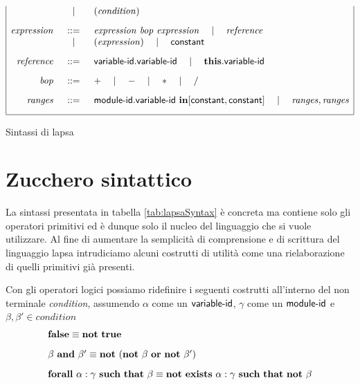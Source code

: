 \begin{table}[htbp!]
$$\begin{array}{|rcl|}
		& \quad\mid\quad & (\mathit{condition})
	\\[.3cm]
	\mathit{expression} &::=& \mathit{expression} \mbox{ } \mathit{bop} \mbox{ } \mathit{expression} \quad\mid\quad \mathit{reference} \\
	& \quad\mid\quad & (\mathit{expression}) \quad\mid\quad {\sf constant}
	\\[.3cm]
	\mathit{reference} &::=& {\sf variable}\textrm{-}{\sf id}\mathbf{.}{\sf variable}\textrm{-}{\sf id} \quad\mid\quad \mathbf{this}\mathbf{.}{\sf variable}\textrm{-}{\sf id}
	\\[.3cm]
	\mathit{bop} &::=& + \quad\mid\quad - \quad\mid\quad * \quad\mid\quad \slash
	\\[.3cm]
	\mathit{ranges} &::=& {\sf module}\textrm{-}{\sf id}\mathbf{.}{\sf variable}\textrm{-}{\sf id} \mbox{ } \mathbf{in} [{\sf constant}, {\sf constant}] \quad\mid\quad \mathit{ranges}, \mathit{ranges} 
	\\[.3cm]
	\hline
	\end{array}
$$
\caption{Sintassi di \acs{lapsa}}
\label{tab:lapsaSyntax}
\end{table}

\section{Zucchero sintattico}
La sintassi presentata in tabella \ref{tab:lapsaSyntax} è concreta ma contiene solo gli operatori primitivi ed è dunque solo il nucleo del linguaggio che si vuole utilizzare. Al fine di aumentare la semplicità di comprensione e di scrittura del linguaggio \ac{lapsa} intrudiciamo alcuni costrutti di utilità come una rielaborazione di quelli primitivi già presenti.

Con gli operatori logici possiamo ridefinire i seguenti costrutti all'interno del non terminale \emph{condition}, assumendo $\alpha$ come un ${\sf variable}\textrm{-}{\sf id}$, $\gamma$ come un ${\sf module}\textrm{-}{\sf id}$ e $\beta,\beta' \in \mathit{condition}$
$$
\begin{array}{l}
	\mathbf{false} \equiv \mathbf{not} \mbox{ } \mathbf{true}
	\\[.3cm]
	\beta \mbox{ } \mathbf{and} \mbox{ } \beta' \equiv \mathbf{not} \mbox{ } (\mathbf{not} \mbox{ } \beta \mbox{ } \mathbf{or} \mbox{ } \mathbf{not} \mbox{ } \beta')
	\\[.3cm]
	\mathbf{forall} \mbox{ } \alpha:\gamma \mbox{ } \mathbf{such} \mbox{ } \mathbf{that} \mbox{ } \beta \equiv \mathbf{not} \mbox{ } \mathbf{exists} \mbox{ } \alpha:\gamma \mbox{ } \mathbf{such} \mbox{ } \mathbf{that} \mbox{ } \mathbf{not} \mbox{ } \beta
	\\
\end{array}
$$

